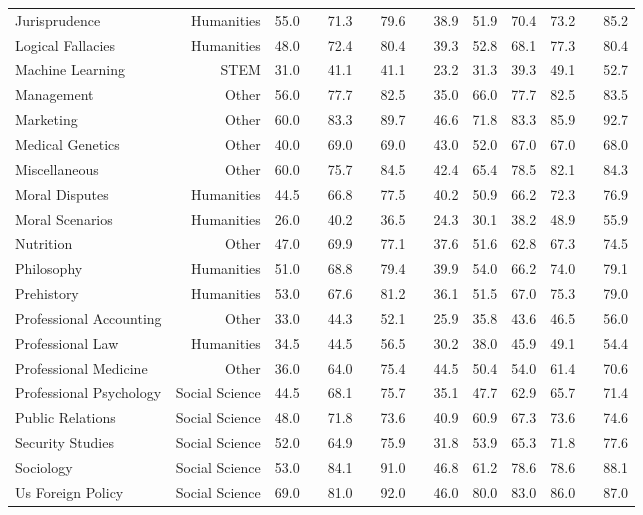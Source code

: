 \documentclass[11pt]{article}
\begin{document}
\begin{table}
{\begin{tabular}{@{}lr cc cc cc cccc c c@{}}
Jurisprudence & Humanities & 55.0 && 71.3 && 79.6 && 38.9 & 51.9 & 70.4 & 73.2 && 85.2  \\
Logical Fallacies & Humanities & 48.0 && 72.4 && 80.4 && 39.3 & 52.8 & 68.1 & 77.3 && 80.4  \\
Machine Learning & STEM & 31.0 && 41.1 && 41.1 && 23.2 & 31.3 & 39.3 & 49.1 && 52.7  \\
Management & Other & 56.0 && 77.7 && 82.5 && 35.0 & 66.0 & 77.7 & 82.5 && 83.5  \\
Marketing & Other & 60.0 && 83.3 && 89.7 && 46.6 & 71.8 & 83.3 & 85.9 && 92.7  \\
Medical Genetics & Other & 40.0 && 69.0 && 69.0 && 43.0 & 52.0 & 67.0 & 67.0 && 68.0  \\
Miscellaneous & Other & 60.0 && 75.7 && 84.5 && 42.4 & 65.4 & 78.5 & 82.1 && 84.3  \\
Moral Disputes & Humanities & 44.5 && 66.8 && 77.5 && 40.2 & 50.9 & 66.2 & 72.3 && 76.9  \\
Moral Scenarios & Humanities & 26.0 && 40.2 && 36.5 && 24.3 & 30.1 & 38.2 & 48.9 && 55.9  \\
Nutrition & Other & 47.0 && 69.9 && 77.1 && 37.6 & 51.6 & 62.8 & 67.3 && 74.5  \\
Philosophy & Humanities & 51.0 && 68.8 && 79.4 && 39.9 & 54.0 & 66.2 & 74.0 && 79.1  \\
Prehistory & Humanities & 53.0 && 67.6 && 81.2 && 36.1 & 51.5 & 67.0 & 75.3 && 79.0  \\
Professional Accounting & Other & 33.0 && 44.3 && 52.1 && 25.9 & 35.8 & 43.6 & 46.5 && 56.0  \\
Professional Law & Humanities & 34.5 && 44.5 && 56.5 && 30.2 & 38.0 & 45.9 & 49.1 && 54.4  \\
Professional Medicine & Other & 36.0 && 64.0 && 75.4 && 44.5 & 50.4 & 54.0 & 61.4 && 70.6  \\
Professional Psychology & Social Science & 44.5 && 68.1 && 75.7 && 35.1 & 47.7 & 62.9 & 65.7 && 71.4  \\
Public Relations & Social Science & 48.0 && 71.8 && 73.6 && 40.9 & 60.9 & 67.3 & 73.6 && 74.6  \\
Security Studies & Social Science & 52.0 && 64.9 && 75.9 && 31.8 & 53.9 & 65.3 & 71.8 && 77.6  \\
Sociology & Social Science & 53.0 && 84.1 && 91.0 && 46.8 & 61.2 & 78.6 & 78.6 && 88.1  \\
Us Foreign Policy & Social Science & 69.0 && 81.0 && 92.0 && 46.0 & 80.0 & 83.0 & 86.0 && 87.0  \\

\end{tabular}}
\end{table}
\end{document}
